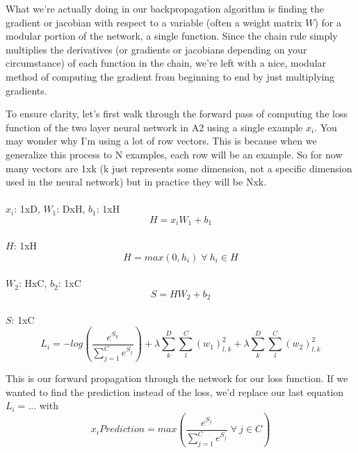 \documentclass[12pt]{article}
\begin{document}
What we're actually doing in our backpropagation algorithm is finding the 
gradient or jacobian with respect to a variable (often a weight matrix $W$) for a modular portion
of the network, a single function. Since the chain rule simply multiplies the derivatives (or gradients or jacobians 
depending on your circumstance) of each function in the chain, we're left with a nice, modular 
method of computing the gradient from beginning to end by just multiplying gradients. 

To ensure clarity, let's first walk through the forward pass of computing the 
loss function of the two layer neural network in A2 using a single 
example $x_i$. You may wonder why I'm using a lot of row vectors. This is because when we generalize 
this process to N examples, each row will be an example. So for now many vectors are 1xk (k just represents some
dimension, not a specific dimension used in the neural network) but in practice they will be Nxk.

\paragraph{}$x_i$: 1xD, $W_1$: DxH, $b_1$: 1xH
\begin{equation}
    H = x_iW_1 + b_1
\end{equation}
\paragraph{}$H$: 1xH
\begin{equation}
    H = max(0, h_i) \;\forall \:h_i \in H
\end{equation}
\paragraph{}$W_2$: HxC, $b_2$: 1xC
\begin{equation}
    S = HW_2 + b_2
\end{equation}
\paragraph{}$S$: 1xC
\begin{equation}
    L_i = - log(\frac{e^{S_y}}{{\sum_{j=1}^C} e^{S_j}}) + 
    \lambda \sum_{k}^D \sum_{l}^C (w_1)_{l, k}^2 + 
    \lambda \sum_{k}^D \sum_{l}^C (w_2)_{l, k}^2
\end{equation}

This is our forward propagation through the network for our loss function. 
If we wanted to find the prediction instead of the loss, 
we'd replace our last equation $L_i = ...$ with 
\begin{equation}
    x_i Prediction = max(\frac{e^{S_j}}{{\sum_{j=1}^C} e^{S_j}} \;\forall \: j \in C )
\end{equation}
\end{document}
